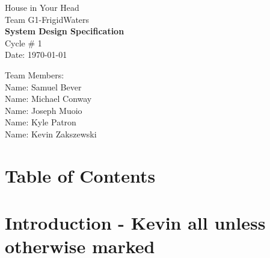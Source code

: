 \documentclass{article}
\begin{document}
\begin{titlepage}
    \begin{center}
        \begin{huge}
        House in Your Head \\[1cm]
        Team G1-FrigidWaters \\[2.2cm]
        { \bfseries System Design Specification } \\[1cm]
        Cycle \# 1\\[2.2cm]
        Date: \required\today\\[1cm]
        \end{huge}
    \end{center}
    \null \vfill
    \begin{large}
        Team Members: \\[0.5cm]
        Name: Samuel Bever\\[0.5cm]
        Name: Michael Conway\\[0.5cm]
        Name: Joseph Muoio\\[0.5cm]
        Name: Kyle Patron\\[0.5cm]
        Name: Kevin Zakszewski
    \end{large}
\end{titlepage}
\section*{\centering Table of Contents}
\makeatletter
{}
\newcommand{\hsubsubsection}{
\@startsection{subsubsection}{3}{\z@}%
                                     {-3.25ex\@plus -1ex \@minus -.2ex}%
                                     {-1.5ex \@plus -.2ex}%
                                     {R\normalfont\normalsize}}
\newcommand{\hparagraph}{
\@startsection{paragraph}{4}{\z@}%
                                     {-3.25ex\@plus -1ex \@minus -.2ex}%
                                     {-1.5ex \@plus -.2ex}%
                                     {R\normalfont\normalsize}}
\newcommand{\hsubparagraph}{
\@startsection{subparagraph}{5}{\z@}%
                                     {-3.25ex\@plus -1ex \@minus -.2ex}%
                                     {-1.5ex \@plus -.2ex}%
                                     {R\normalfont\normalsize}}
\setcounter{secnumdepth}{5}
\makeatother
\newpage
 

\section{Introduction - Kevin all unless otherwise marked}
\end{document}
